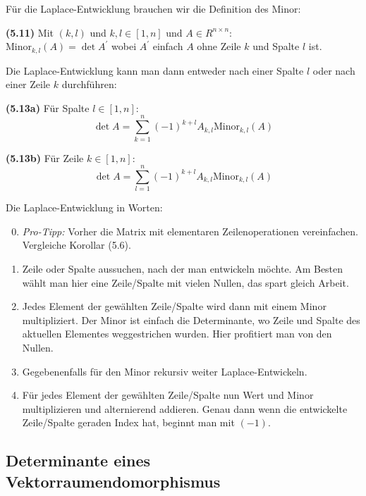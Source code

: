 \documentclass[a4paper,parskip=half*,DIV=15,fontsize=11pt]{scrartcl}
\newlength{\hangwidth}
\newcommand{\skript}[1]{\settowidth{\hangwidth}{\textbf{(#1)} }\hangpara{\hangwidth}{1}\textbf{(#1)} \ignorespaces} %
\begin{document}
Für die Laplace-Entwicklung brauchen wir die Definition des Minor:

\skript{5.11} Mit $(k,l)$ und $k,l \in [1,n]$ und $A \in R^{n \times n}$:\\ $\textrm{Minor}_{k,l}(A) = \det A^\prime$ wobei $A^\prime$ einfach $A$ ohne Zeile $k$ und Spalte $l$ ist.

Die Laplace-Entwicklung kann man dann entweder nach einer Spalte $l$ oder nach einer Zeile $k$ durchführen:

\begin{minipage}{0.45\textwidth}
\skript{5.13a} Für Spalte $l \in [1,n]$: \\
$$\det A = \sum_{k=1}^n (-1)^{k+l} A_{k,l} \textrm{Minor}_{k,l}(A)$$
\end{minipage}\hspace{0.05\textwidth}
\begin{minipage}{0.45\textwidth}
\skript{5.13b} Für Zeile $k \in [1,n]$: \\
$$\det A = \sum_{l=1}^n (-1)^{k+l} A_{k,l} \textrm{Minor}_{k,l}(A)$$
\end{minipage}

Die Laplace-Entwicklung in Worten:

\begin{enumerate}
\setcounter{enumi}{-1}
\item \textit{Pro-Tipp:} Vorher die Matrix mit elementaren Zeilenoperationen vereinfachen. Vergleiche Korollar (5.6).
\item Zeile oder Spalte aussuchen, nach der man entwickeln möchte. Am Besten wählt man hier eine Zeile/Spalte mit vielen Nullen, das spart gleich Arbeit.
\item Jedes Element der gewählten Zeile/Spalte wird dann mit einem Minor multipliziert. Der Minor ist einfach die Determinante, wo Zeile und Spalte des aktuellen Elementes weggestrichen wurden. Hier profitiert man von den Nullen.
\item Gegebenenfalls für den Minor rekursiv weiter Laplace-Entwickeln.
\item Für jedes Element der gewählten Zeile/Spalte nun Wert und Minor multiplizieren und alternierend addieren. Genau dann wenn die entwickelte Zeile/Spalte geraden Index hat, beginnt man mit $(-1)$.
\end{enumerate}

\subsection{Determinante eines Vektorraumendomorphismus}
\end{document}
